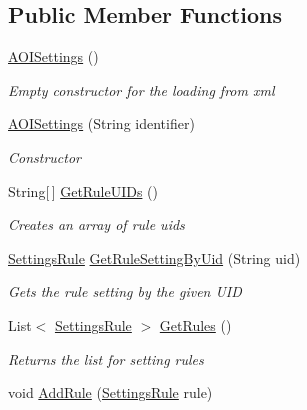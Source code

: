 \subsection*{Public Member Functions}
\begin{DoxyCompactItemize}
\item 
\hyperlink{class_web_analyzer_1_1_models_1_1_settings_model_1_1_a_o_i_settings_acc73516628d0ab05d5a8f5b838407e2e}{A\+O\+I\+Settings} ()
\begin{DoxyCompactList}\small\item\em Empty constructor for the loading from xml \end{DoxyCompactList}\item 
\hyperlink{class_web_analyzer_1_1_models_1_1_settings_model_1_1_a_o_i_settings_a2d797a5be30a7909bcc9c74be10dea3c}{A\+O\+I\+Settings} (String identifier)
\begin{DoxyCompactList}\small\item\em Constructor \end{DoxyCompactList}\item 
String\mbox{[}$\,$\mbox{]} \hyperlink{class_web_analyzer_1_1_models_1_1_settings_model_1_1_a_o_i_settings_a23e13f1b50742eb83541f1cabd2d87b2}{Get\+Rule\+U\+I\+Ds} ()
\begin{DoxyCompactList}\small\item\em Creates an array of rule uids \end{DoxyCompactList}\item 
\hyperlink{class_web_analyzer_1_1_models_1_1_settings_model_1_1_settings_rule}{Settings\+Rule} \hyperlink{class_web_analyzer_1_1_models_1_1_settings_model_1_1_a_o_i_settings_aae020cd67c0393838d5009a26ca7f681}{Get\+Rule\+Setting\+By\+Uid} (String uid)
\begin{DoxyCompactList}\small\item\em Gets the rule setting by the given U\+I\+D \end{DoxyCompactList}\item 
List$<$ \hyperlink{class_web_analyzer_1_1_models_1_1_settings_model_1_1_settings_rule}{Settings\+Rule} $>$ \hyperlink{class_web_analyzer_1_1_models_1_1_settings_model_1_1_a_o_i_settings_a1c6ceda7984e284a499445f7a95afb10}{Get\+Rules} ()
\begin{DoxyCompactList}\small\item\em Returns the list for setting rules \end{DoxyCompactList}\item 
void \hyperlink{class_web_analyzer_1_1_models_1_1_settings_model_1_1_a_o_i_settings_a90d2d9b1f0a445bf8d9d59838eeaae86}{Add\+Rule} (\hyperlink{class_web_analyzer_1_1_models_1_1_settings_model_1_1_settings_rule}{Settings\+Rule} rule)

\end{DoxyCompactItemize}

